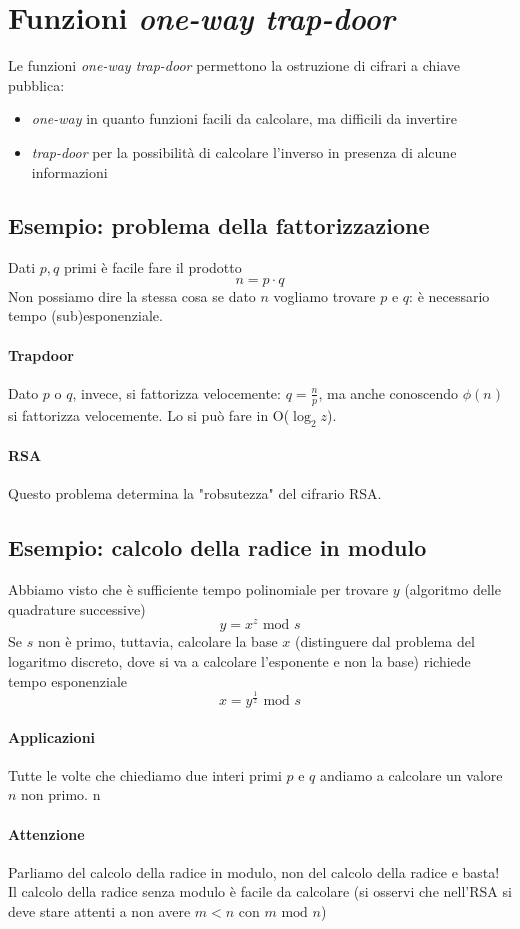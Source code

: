 \section{Funzioni \textit{one-way trap-door}}
Le funzioni \emph{one-way trap-door} permettono la ostruzione di cifrari a chiave pubblica: 
\begin{itemize}
	\item \emph{one-way} in quanto funzioni facili da calcolare, ma difficili da invertire
	\item \emph{trap-door} per la possibilità di calcolare l'inverso in presenza di alcune informazioni
\end{itemize} 

\subsection{Esempio: problema della fattorizzazione} Dati $p, q$ primi è facile fare il prodotto
$$ n = p \cdot q$$
Non possiamo dire la stessa cosa se dato $n$ vogliamo trovare $p$ e $q$: è necessario tempo (sub)esponenziale. 
\paragraph{Trapdoor} Dato $p$ o $q$, invece, si fattorizza velocemente: $q = \frac{n}{p}$, ma anche conoscendo $\phi(n)$ si fattorizza velocemente. Lo si può fare in O($\log_2z$).
\paragraph{RSA} Questo problema determina la "robsutezza" del cifrario RSA.

\subsection{Esempio: calcolo della radice in modulo}
Abbiamo visto che è sufficiente tempo polinomiale per trovare $y$ (algoritmo delle quadrature successive)
$$y = x^z \text{ mod } s $$
Se $s$ non è primo, tuttavia, calcolare la base $x$ (distinguere dal problema del logaritmo discreto, dove si va a calcolare l'esponente e non la base) richiede tempo esponenziale $$x = y^{\frac{1}{z}} \text{ mod } s$$ 
\paragraph{Applicazioni} Tutte le volte che chiediamo due interi primi $p$ e $q$ andiamo a calcolare un valore $n$ non primo.
n 
\paragraph{Attenzione} Parliamo del calcolo della radice in modulo, non del calcolo della radice e basta! Il calcolo della radice senza modulo è facile da calcolare (si osservi che nell'RSA si deve stare attenti a non avere $m<n$ con $m \text{ mod } n$)



\paragraph{}